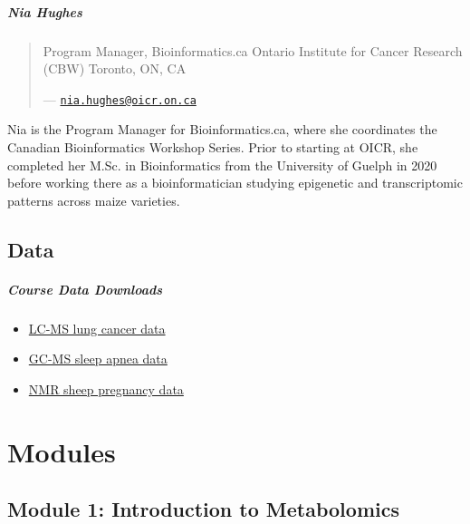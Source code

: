 \documentclass[
]{book}
\providecommand{\tightlist}{%
  \setlength{\itemsep}{0pt}\setlength{\parskip}{0pt}}
\begin{document}
\subsubsection{Nia Hughes}\label{nia-hughes}

\begin{quote}
Program Manager, Bioinformatics.ca
Ontario Institute for Cancer Research (CBW)
Toronto, ON, CA

--- \href{mailto:nia.hughes@oicr.on.ca}{\nolinkurl{nia.hughes@oicr.on.ca}}
\end{quote}

Nia is the Program Manager for Bioinformatics.ca, where she coordinates
the Canadian Bioinformatics Workshop Series. Prior to starting at OICR, she completed her
M.Sc. in Bioinformatics from the University of Guelph in 2020 before working there as a
bioinformatician studying epigenetic and transcriptomic patterns across maize varieties.

\chapter{Data}\label{data}

\subsubsection{Course Data Downloads}\label{course-data-downloads}

\begin{itemize}
\tightlist
\item
  \href{https://drive.google.com/file/d/1cvs1t7__xR6u4U7FNM2oht17Om6E3ZaF/view}{LC-MS lung cancer data}
\item
  \href{https://drive.google.com/file/d/1tGKu6pPbBWd3MAFtWSn5kxV0cvjX_mab/view}{GC-MS sleep apnea data}
\item
  \href{https://drive.google.com/file/d/1GvRMVJZkVdzikDZC4RDB-ef22_Px4Xs_/view}{NMR sheep pregnancy data}
\end{itemize}

\part{Modules}\label{part-modules}

\chapter{Module 1: Introduction to Metabolomics}\label{module-1-introduction-to-metabolomics}
\end{document}

